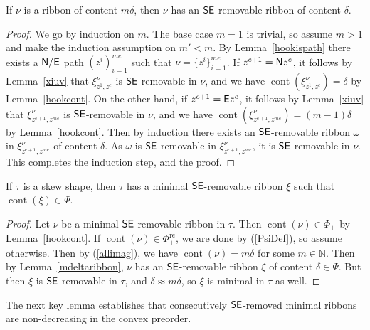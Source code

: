 \documentclass[Unicode,ALCO]{cedram}
\newcommand{\0}{{\bar 0}}
\newcommand{\NN}{{\mathbb N}}
\newcommand{\no}{{\sf N}}
\newcommand{\ea}{{\sf E}}
\newcommand{\ssee}{{\sf SE}}
\def\cont{{\operatorname{cont}}}
\def\re{{\mathrm{re}}}
\begin{document}
\begin{lemma}\label{mdeltaribbon}
If \(\nu\) is a ribbon of content \(m\delta\), then \(\nu\) has an \(\ssee\)-removable ribbon of content \(\delta\).
\end{lemma}
\begin{proof}
We go by induction on \(m\). The base case \(m=1\) is trivial, so assume \(m>1\) and make the induction assumption on \(m' < m\). By Lemma~\ref{hookispath} there exists a \(\no/\ea\) path \((z^i)_{i=1}^{me}\) such that \(\nu = \{z^i\}_{i=1}^{me}\). If \(z^{e+1} = \no z^e\), it follows by Lemma~\ref{xiuv} that \(\xi^\nu_{z^1, z^e}\) is \(\ssee\)-removable in \(\nu\), and we have \(\cont(\xi^\nu_{z^1,z^e}) = \delta\) by Lemma~\ref{hookcont}. On the other hand, if \(z^{e+1} = \ea z^e\), it follows by Lemma~\ref{xiuv} that \(\xi^\nu_{z^{e+1}, z^{me}}\) is \(\ssee\)-removable in \(\nu\), and we have \(\cont(\xi^\nu_{z^{e+1}, z^{me}}) = (m-1)\delta\) by Lemma~\ref{hookcont}. Then by induction there exists an \(\ssee\)-removable ribbon \(\omega\) in \(\xi^\nu_{z^{e+1}, z^{me}}\) of content \(\delta\). As \(\omega\) is \(\ssee\)-removable in \(\xi^\nu_{z^{e+1}, z^{me}}\), it is \(\ssee\)-removable in \(\nu\). This completes the induction step, and the proof.
\end{proof}


\begin{lemma}\label{minremexist}
If \(\tau\) is a skew shape, then \(\tau\) has a minimal \(\ssee\)-removable ribbon \(\xi\) such that \(\cont(\xi) \in \Psi\).
\end{lemma}
\begin{proof}
Let \(\nu\) be a minimal \(\ssee\)-removable ribbon in \(\tau\). Then \(\cont(\nu) \in \Phi_+\) by Lemma~\ref{hookcont}. If \(\cont(\nu) \in \Phi_+^\re\), we are done by (\ref{PsiDef}), so assume otherwise. Then 
by (\ref{allimag}), we have \(\cont(\nu) = m\delta\) for some \(m\in \NN\).
Then by Lemma~\ref{mdeltaribbon}, \(\nu\) has an \(\ssee\)-removable ribbon \(\xi\) of content \(\delta \in \Psi\). But then \(\xi\) is \(\ssee\)-removable in \(\tau\), and \(\delta \approx m\delta\), so \(\xi\) is minimal in \(\tau\) as well.
\end{proof}

The next key lemma establishes that consecutively \(\ssee\)-removed minimal ribbons are non-decreasing in the convex preorder. 
\end{document}
